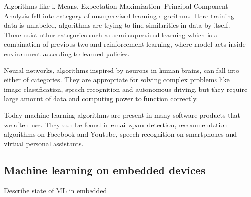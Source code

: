 Algorithms like k-Means, Expectation Maximization, Principal Component Analysis fall into category of unsupervised learning algorithms.
Here training data is unlabeled, algorithms are trying to find similarities in data by itself\cite{geron}.
There exist other categories such as semi-supervised learning which is a combination of previous two and reinforcement learning, where model acts inside environment according to learned policies\cite{geron}.

Neural networks, algorithms inspired by neurons in human brains\cite{geron}\cite{cs231n}, can fall into either of categories. 
They are appropriate for solving complex problems like image classification, speech recognition and autonomous driving, but they require large amount of data and computing power to function correctly.

Today machine learning algorithms are present in many software products that we often use. 
They can be found in email spam detection, recommendation algorithms on Facebook and Youtube, speech recognition on smartphones and virtual personal assistants. 


\subsection{ Machine learning on embedded devices}


Describe state of ML in embedded



